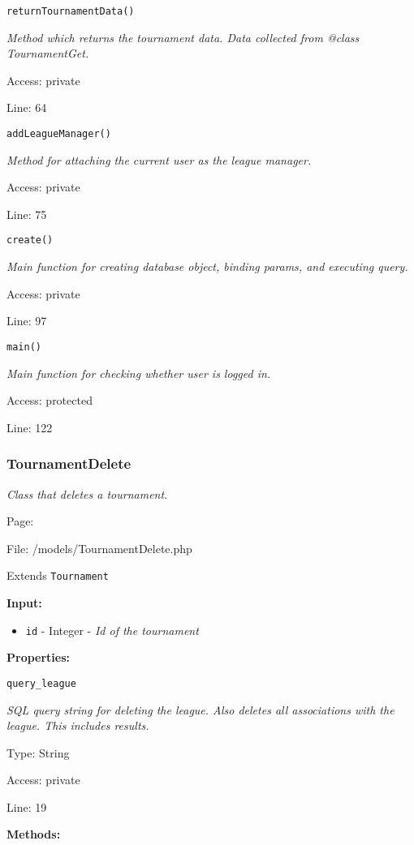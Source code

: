 \texttt{returnTournamentData()}

{\scriptsize
\textit{Method which returns the tournament data.
Data collected from @class TournamentGet.}

Access: private

Line: 64

}

\texttt{addLeagueManager()}

{\scriptsize
\textit{Method for attaching the current user as the league manager.}

Access: private

Line: 75

}

\texttt{create()}

{\scriptsize
\textit{Main function for creating database object, binding params, and executing query.}

Access: private

Line: 97

}

\texttt{main()}

{\scriptsize
\textit{Main function for checking whether user is logged in.}

Access: protected

Line: 122

}

\subsubsection{TournamentDelete}\label{TournamentDelete.php.doc}
\textit{Class that deletes a tournament.}

Page: \pageref{TournamentDelete.php}

File: /models/TournamentDelete.php

Extends \texttt{Tournament}

\textbf{Input:}
\begin{itemize}
\item \texttt{id} - Integer - \textit{Id of the tournament}
\end{itemize}

\textbf{Properties:}

\texttt{query\_league}

{\scriptsize
\textit{SQL query string for deleting the league.
Also deletes all associations with the league.
This includes results.}

Type: String

Access: private

Line: 19

}
\textbf{Methods:}

